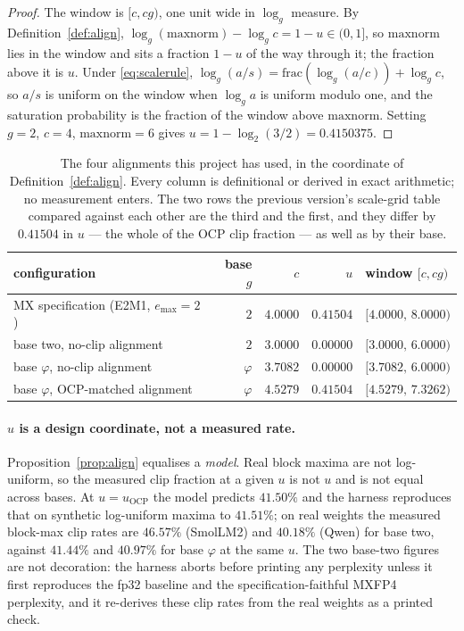 \documentclass[11pt]{article}
\theoremstyle{definition}
\begin{document}
\begin{proof}
The window is $[c,cg)$, one unit wide in $\log_g$ measure. By
Definition~\ref{def:align},
$\log_g(\mathrm{maxnorm}) - \log_g c = 1-u \in (0,1]$, so $\mathrm{maxnorm}$
lies in the window and sits a fraction $1-u$ of the way through it; the fraction
above it is $u$. Under \eqref{eq:scalerule},
$\log_g(a/s) = \mathrm{frac}(\log_g(a/c)) + \log_g c$, so $a/s$ is uniform on
the window when $\log_g a$ is uniform modulo one, and the saturation probability
is the fraction of the window above $\mathrm{maxnorm}$. Setting $g=2$, $c=4$,
$\mathrm{maxnorm}=6$ gives $u = 1-\log_2(3/2) = 0.4150375$.
\end{proof}

\begin{table}[t]\centering
\caption{The four alignments this project has used, in the coordinate of
Definition~\ref{def:align}. Every column is definitional or derived in exact
arithmetic; no measurement enters. The two rows the previous version's
scale-grid table compared against each other are the third and the first, and
they differ by $0.41504$ in $u$ --- the whole of the OCP clip fraction --- as
well as by their base.}
\label{tab:align}
\begin{tabular}{lrrrl}
\toprule
configuration & base $g$ & $c$ & $u$ & window $[c,cg)$ \\
\midrule
MX specification (E2M1, $e_{\max}=2$)~\cite{ocpmx} & $2$ & $4.0000$ & $0.41504$ & $[4.0000,\,8.0000)$ \\
base two, no-clip alignment                        & $2$ & $3.0000$ & $0.00000$ & $[3.0000,\,6.0000)$ \\
base $\varphi$, no-clip alignment                  & $\varphi$ & $3.7082$ & $0.00000$ & $[3.7082,\,6.0000)$ \\
base $\varphi$, OCP-matched alignment              & $\varphi$ & $4.5279$ & $0.41504$ & $[4.5279,\,7.3262)$ \\
\bottomrule
\end{tabular}
\end{table}

\paragraph{$u$ is a design coordinate, not a measured rate.}
Proposition~\ref{prop:align} equalises a \emph{model}. Real block maxima are not
log-uniform, so the measured clip fraction at a given $u$ is not $u$ and is not
equal across bases. At $u=u_{\mathrm{OCP}}$ the model predicts $41.50\%$ and the
harness reproduces that on synthetic log-uniform maxima to $41.51\%$; on real
weights the measured block-max clip rates are $46.57\%$ (SmolLM2) and $40.18\%$
(Qwen) for base two, against $41.44\%$ and $40.97\%$ for base $\varphi$ at the
same $u$.%
The two base-two figures are not decoration: the harness aborts before printing
any perplexity unless it first reproduces the fp32 baseline and the
specification-faithful MXFP4 perplexity, and it re-derives these clip rates from
the real weights as a printed check.
\end{document}
